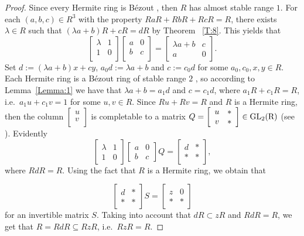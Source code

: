 \documentclass[12pt,a4paper, reqno]{amsart}
\def\GL{\rm GL}
\begin{document}
\begin{proof}
Since every  Hermite ring is B\'ezout  \cite[Corolary 2.13]{12-zabavsky},
then $R$  has almost stable range $1$.  For each $(a,b,c)\in R^3$ with the property  $RaR+RbR+RcR=R$,  there exists $\lambda \in R$ such  that $(\lambda a+b)R+cR=dR$ by Theorem ~\ref{T:8}. This yields that
\[
\left[\begin{array}{cc}
\lambda&1\\
1&0\\
\end{array}
\right]
\left[\begin{array}{cc}
a&0\\
b&c\\
\end{array}\right]=\left[\begin{array}{cc}\lambda a+b& c\\a&0\end{array}\right].
\]
Set $d:=(\lambda a+b)x+cy$,  $a_0d:=\lambda a+b$ and  $c:=c_0d$ for some $a_0,c_0,x,y\in R$. Each Hermite ring is a B\'ezout ring of stable range $2$ \cite[Theorem~1.2.40]{12-zabavsky}, so  according to Lemma~\ref{Lemma:1} we have that $\lambda a+b=a_1d$ and  $c=c_1d$, where $a_1R+c_1R=R$,
i.e.~$a_1u+c_1v=1$ for some $u,v\in R$. Since $Ru+Rv=R$ and $R$ is a Hermite ring, then the  column
$\left[\begin{array}{c}
u \\
v\\
\end{array}\right]$
is completable   to a  matrix $
Q=\left[\begin{array}{cc}

        u & * \\
        v & *
\end{array}\right]\in \GL_2(R)$ (see  \cite[Corolary 2.1.7]{12-zabavsky}). Evidently
\[
\left[\begin{array}{cc}\lambda& 1\\1&0\end{array}\right]\left[\begin{array}{cc}a&0\\b&c\end{array}\right]Q=\left[\begin{array}{cc}d& *\\ * & *\end{array}\right],
\]
where $RdR=R$. Using the fact that  $R$ is a Hermite ring,  we obtain that

\[
\left[\begin{array}{cc} d& *\\ * & *\end{array}\right]S=
\left[\begin{array}{cc}z& 0\\ * & *\end{array}\right]
\]
for an invertible  matrix $S$. Taking into account that   $dR\subset zR$ and $RdR=R$, we get that  $R=RdR\subseteq RzR$, i.e.~$RzR=R$.
\end{proof}
\end{document}
